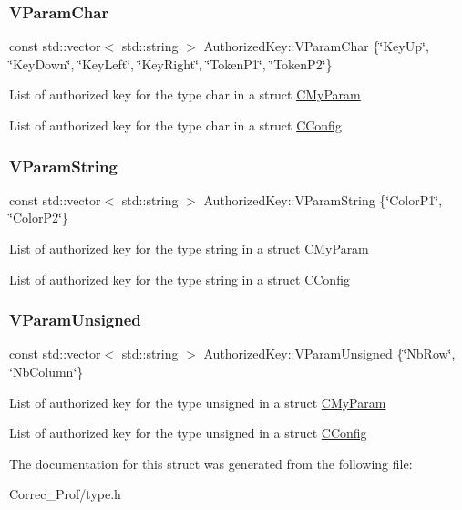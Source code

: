 \subsubsection{\texorpdfstring{V\+Param\+Char}{VParamChar}}
{\footnotesize\ttfamily const std\+::vector$<$ std\+::string $>$ Authorized\+Key\+::\+V\+Param\+Char \{\char`\"{}Key\+Up\char`\"{}, \char`\"{}Key\+Down\char`\"{}, \char`\"{}Key\+Left\char`\"{}, \char`\"{}Key\+Right\char`\"{}, \char`\"{}Token\+P1\char`\"{}, \char`\"{}Token\+P2\char`\"{}\}}

List of authorized key for the type char in a struct \hyperlink{struct_c_my_param}{C\+My\+Param}

List of authorized key for the type char in a struct \hyperlink{struct_c_config}{C\+Config} \mbox{\label{struct_authorized_key_a78305cf96884024f75b2d73a53f0049e}} 
\subsubsection{\texorpdfstring{V\+Param\+String}{VParamString}}
{\footnotesize\ttfamily const std\+::vector$<$ std\+::string $>$ Authorized\+Key\+::\+V\+Param\+String \{\char`\"{}Color\+P1\char`\"{}, \char`\"{}Color\+P2\char`\"{}\}}

List of authorized key for the type string in a struct \hyperlink{struct_c_my_param}{C\+My\+Param}

List of authorized key for the type string in a struct \hyperlink{struct_c_config}{C\+Config} \mbox{\label{struct_authorized_key_ab8eb36f2144756c872dcf3e18b00b06e}} 
\subsubsection{\texorpdfstring{V\+Param\+Unsigned}{VParamUnsigned}}
{\footnotesize\ttfamily const std\+::vector$<$ std\+::string $>$ Authorized\+Key\+::\+V\+Param\+Unsigned \{\char`\"{}Nb\+Row\char`\"{}, \char`\"{}Nb\+Column\char`\"{}\}}

List of authorized key for the type unsigned in a struct \hyperlink{struct_c_my_param}{C\+My\+Param}

List of authorized key for the type unsigned in a struct \hyperlink{struct_c_config}{C\+Config} 

The documentation for this struct was generated from the following file\+:\begin{DoxyCompactItemize}
\item 
Correc\+\_\+\+Prof/type.\+h\end{DoxyCompactItemize}
